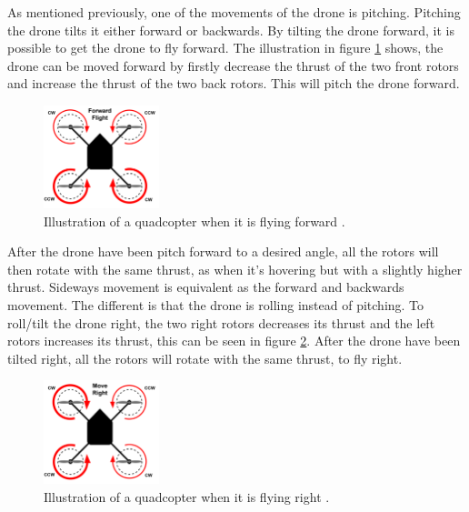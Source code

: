 \newline
\newline
As mentioned previously, one of the movements of the drone is pitching. Pitching the drone tilts it either forward or backwards. By tilting the drone forward, it is possible to get the drone to fly forward. The illustration in figure \ref{fig:dronePhysics_2} shows, the drone can be moved forward by firstly decrease the thrust of the two front rotors and increase the thrust of the two back rotors. This will pitch the drone forward.
\begin{figure}[h]
    \centering
    \includegraphics[width=0.3\textwidth]{figures/ch_intro/physics-of-multirotor-2.png}
    \caption{Illustration of a quadcopter when it is flying forward \cite[Redrawn]{PhysicsofDroneFlight}.}
    \label{fig:dronePhysics_2}
\end{figure}
\newline
\newline
After the drone have been pitch forward to a desired angle, all the rotors will then rotate with the same thrust, as when it's hovering but with a slightly higher thrust\cite{PhysicsofDroneFlight}.
\newline
\newline
Sideways movement is equivalent as the forward and backwards movement. The different is that the drone is rolling instead of pitching. To roll/tilt the drone right, the two right rotors decreases its thrust and the left rotors increases its thrust, this can be seen in figure \ref{fig:dronePhysics_3}. After the drone have been tilted right, all the rotors will rotate with the same thrust, to fly right. 
\begin{figure}[h]
    \centering
    \includegraphics[width=0.3\textwidth]{figures/ch_intro/physics-of-multirotor-3.png}
    \caption{Illustration of a quadcopter when it is flying right \cite[Redrawn]{PhysicsofDroneFlight}.}
    \label{fig:dronePhysics_3}
\end{figure}
